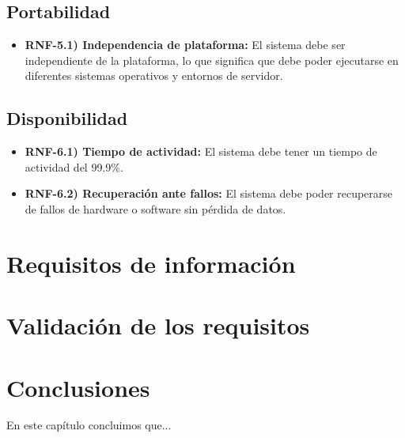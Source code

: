 \subsection{Portabilidad}

\begin{itemize}
    \item \textbf{RNF-5.1) Independencia de plataforma:} El sistema debe ser independiente de la plataforma, lo que significa que debe poder ejecutarse en diferentes sistemas operativos y entornos de servidor.
\end{itemize}

\subsection{Disponibilidad}

\begin{itemize}
    \item \textbf{RNF-6.1) Tiempo de actividad:} El sistema debe tener un tiempo de actividad del 99.9\%.
    \item \textbf{RNF-6.2) Recuperación ante fallos:} El sistema debe poder recuperarse de fallos de hardware o software sin pérdida de datos.
\end{itemize}

\section{Requisitos de información}

\section{Validación de los requisitos}

\section{Conclusiones}
En este capítulo concluimos que...